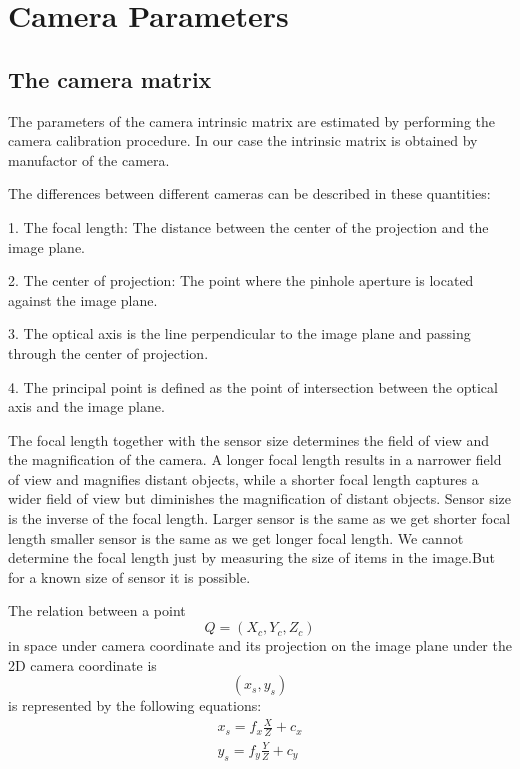 \documentclass{article}
\begin{document}
\section{Camera Parameters}
\subsection[short]{The camera matrix}

The parameters of the camera intrinsic matrix are estimated by performing the camera calibration procedure. In our case the intrinsic matrix is obtained by manufactor of the camera.

The differences between different cameras can be described in these quantities:  

1. The focal length: The distance between the center of the projection and the image plane.

2. The center of projection: The point where the pinhole aperture is located against the image plane.

3. The optical axis is the line perpendicular to the image plane and passing through the center of projection.

4. The principal point is defined as the point of intersection between the optical axis and the image plane.

The focal length together with the sensor size determines the field of view and the magnification of the camera. A longer focal length results in a narrower field of view and magnifies distant objects, while a shorter focal length captures a wider field of view but diminishes the magnification of distant objects. Sensor size is the inverse of the focal length. Larger sensor is the same as we get shorter focal length smaller sensor is the same as we get longer focal length. We cannot determine the focal length just by measuring the size of items in the image.But for a known size of sensor it is possible.

The relation between a point \begin{equation}
    Q=(X_c, Y_c, Z_c)
\end{equation}in space under camera coordinate and its projection on the image plane under the 2D camera coordinate is \begin{equation}
    (x_s, y_s)
\end{equation} is represented by the following equations:
\begin{eqnarray}
    x_s=f_x\frac{X}{Z}+c_x \\
    y_s=f_y\frac{Y}{Z}+c_y
\end{eqnarray}
\end{document}
